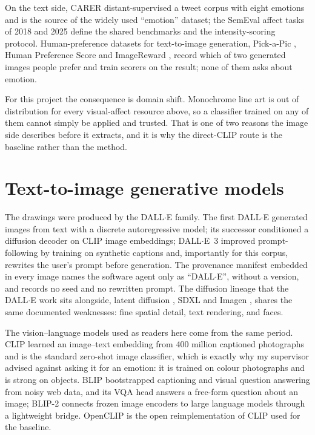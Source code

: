 On the text side, CARER \cite{saravia2018carer} distant-supervised a tweet corpus with eight emotions and is the source of the widely used ``emotion'' dataset; the SemEval affect tasks of 2018 \cite{mohammad2018semeval} and 2025 \cite{muhammad2025semeval} define the shared benchmarks and the intensity-scoring protocol. Human-preference datasets for text-to-image generation, Pick-a-Pic \cite{kirstain2023pick}, Human Preference Score \cite{wu2023human} and ImageReward \cite{xu2023imagereward}, record which of two generated images people prefer and train scorers on the result; none of them asks about emotion.

For this project the consequence is domain shift. Monochrome line art is out of distribution for every visual-affect resource above, so a classifier trained on any of them cannot simply be applied and trusted. That is one of two reasons the image side describes before it extracts, and it is why the direct-CLIP route is the baseline rather than the method.

\section{Text-to-image generative models}
\label{sec:lit-t2i}

The drawings were produced by the DALL$\cdot$E family. The first DALL$\cdot$E \cite{ramesh2021zero} generated images from text with a discrete autoregressive model; its successor \cite{ramesh2022hierarchical} conditioned a diffusion decoder on CLIP image embeddings; DALL$\cdot$E~3 \cite{betker2023improving} improved prompt-following by training on synthetic captions and, importantly for this corpus, rewrites the user's prompt before generation. The provenance manifest embedded in every image names the software agent only as ``DALL$\cdot$E'', without a version, and records no seed and no rewritten prompt. The diffusion lineage that the DALL$\cdot$E work sits alongside, latent diffusion \cite{rombach2022high}, SDXL \cite{podell2023sdxl} and Imagen \cite{saharia2022photorealistic}, shares the same documented weaknesses: fine spatial detail, text rendering, and faces.

The vision--language models used as readers here come from the same period. CLIP \cite{radford2021learning} learned an image--text embedding from 400 million captioned photographs and is the standard zero-shot image classifier, which is exactly why my supervisor advised against asking it for an emotion: it is trained on colour photographs and is strong on objects. BLIP \cite{li2022blip} bootstrapped captioning and visual question answering from noisy web data, and its VQA head answers a free-form question about an image; BLIP-2 \cite{li2023blip} connects frozen image encoders to large language models through a lightweight bridge. OpenCLIP \cite{ilharco2021openclip} is the open reimplementation of CLIP used for the baseline.

